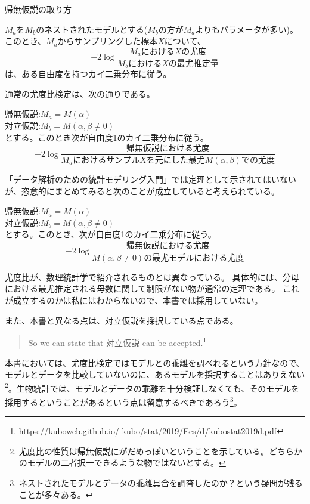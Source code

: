 \begin{SMbox}{帰無仮説の取り方}
    \begin{theorem}
        $M_a$を$M_b$のネストされたモデルとする($M_b$の方が$M_a$よりもパラメータが多い)。このとき、$M_a$からサンプリングした標本$X$について、
        \begin{equation*}
            -2\log\frac{M_aにおけるXの尤度}{M_bにおけるXの最尤推定量}
        \end{equation*}
        は、ある自由度を持つカイ二乗分布に従う。
    \end{theorem}
\fi

    通常の尤度比検定は、次の通りである。
    \begin{theo}
        帰無仮説:$M_a=M(\alpha)$\\
        対立仮説:$M_b=M(\alpha,\beta\neq 0)$\\
        とする。このとき次が自由度1のカイ二乗分布に従う。
        \begin{equation*}
            -2\log\frac{帰無仮説における尤度}{M_aにおけるサンプルXを元にした最尤M(\alpha,\beta)での尤度}
        \end{equation*}
    \end{theo}

    「データ解析のための統計モデリング入門」では定理として示されてはいないが、恣意的にまとめてみると次のことが成立していると考えられている。
    \begin{theo}
        帰無仮説:$M_a=M(\alpha)$\\
        対立仮説:$M_b=M(\alpha,\beta\neq 0)$\\
        とする。このとき、次が自由度1のカイ二乗分布に従う。
        \begin{equation*}
            -2\log\frac{帰無仮説における尤度}{M(\alpha,\beta\neq 0)の最尤モデルにおける尤度}
        \end{equation*}
    \end{theo}
    尤度比が、数理統計学で紹介されるものとは異なっている。
 具体的には、分母における最尤推定される母数に関して制限がない物が通常の定理である。
 これが成立するのかは私にはわからないので、本書では採用していない。

    また、本書と異なる点は、対立仮説を採択している点である。
    \begin{quote}
        So we can state that 対立仮説 can be accepted.\footnote{\url{https://kuboweb.github.io/-kubo/stat/2019/Ees/d/kubostat2019d.pdf}}
    \end{quote}
 本書においては、尤度比検定ではモデルとの乖離を調べれるという方針なので、モデルとデータを比較していないのに、あるモデルを採択することはありえない\footnote{尤度比の性質は帰無仮説にがだめっぽいということを示している。どちらかのモデルの二者択一できるような物ではないとする。}。生物統計では、モデルとデータの乖離を十分検証しなくても、そのモデルを採用するということがあるという点は留意するべきであろう\footnote{ネストされたモデルとデータの乖離具合を調査したのか？という疑問が残ることが多々ある。}。
\end{SMbox}



